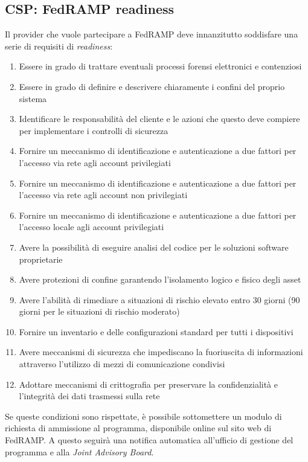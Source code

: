 \documentclass[../main.tex]{subfiles}
\begin{document}
\subsection{CSP: FedRAMP readiness}

Il provider che vuole partecipare a FedRAMP deve innanzitutto soddisfare una serie di requisiti di \textit{readiness}:
\begin{enumerate}
    \item Essere in grado di trattare eventuali processi forensi elettronici e contenziosi 
    \item Essere in grado di definire e descrivere chiaramente i confini del proprio sistema
    \item Identificare le responsabilità del cliente e le azioni che questo deve compiere per implementare i controlli di sicurezza
    \item Fornire un meccanismo di identificazione e autenticazione a due fattori per l'accesso via rete agli account privilegiati
    \item Fornire un meccanismo di identificazione e autenticazione a due fattori per l'accesso via rete agli account non privilegiati
    \item Fornire un meccanismo di identificazione e autenticazione a due fattori per l'accesso locale agli account privilegiati
    \item Avere la possibilità di eseguire analisi del codice per le soluzioni software proprietarie
    \item Avere protezioni di confine garantendo l'isolamento logico e fisico degli asset
    \item Avere l'abilità di rimediare a situazioni di rischio elevato entro 30 giorni (90 giorni per le situazioni di rischio moderato)
    \item Fornire un inventario e delle configurazioni standard per tutti i dispositivi
    \item Avere meccanismi di sicurezza che impediscano la fuoriuscita di informazioni attraverso l'utilizzo di mezzi di comunicazione condivisi
    \item Adottare meccanismi di crittografia per preservare la confidenzialità e l'integrità dei dati trasmessi sulla rete
\end{enumerate}


Se queste condizioni sono rispettate, è possibile sottomettere un modulo di richiesta di ammissione al programma, disponibile online sul sito web di FedRAMP. A questo seguirà una notifica automatica all'ufficio di gestione del programma e alla \textit{Joint Advisory Board}.
\end{document}
